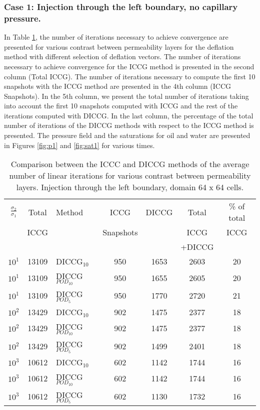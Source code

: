 \documentclass[12pt]{article}
\begin{document}
\subsubsection*{Case 1: Injection through the left boundary, no capillary pressure.}
In Table \ref{table:liter1}, the number of iterations necessary to achieve convergence are presented for various contrast between permeability layers for the deflation method with different selection of deflation vectors. The number of iterations necessary to achieve convergence for the ICCG method is presented in the second column (Total ICCG). The number of iterations necessary to compute the first 10 snapshots with the ICCG method are presented in the 4th column (ICCG Snapshots). In the 5th column, we present the total number of iterations taking into account the first 10 snapshots computed with ICCG and the rest of the iterations computed with DICCG. In the last column, the percentage of the total number of iterations of the DICCG methods with respect to the ICCG method is presented.   
The pressure field and the saturations for oil and water are presented in Figures \ref{fig:p1} and \ref{fig:sat1} for various times.
\begin{table}[!h]\centering
\begin{minipage}{1\textwidth}
 \centering
\begin{tabular}{ ||c|c||l|c|c|c|c||} 
\hline
$\frac{\sigma_2}{\sigma_1}$&Total&Method  & ICCG&DICCG &Total&\% of total\\ 
                           & ICCG     &  & Snapshots& &ICCG& ICCG\\ 
                            &     &  & & &+DICCG& \\
\hline 
$10^{1}$ &13109& DICCG$_{10}$&950&1653&2603&20\\ 
\hline  
$10^{1}$ &13109& DICCG$_{POD_{10}}$&950&1655&2605&20 \\ 
\hline  
$10^{1}$ &13109& DICCG$_{POD_{5}}$&950&1770&2720&21 \\ 
\hline  
$10^{2}$ &13429& DICCG$_{10}$&902&1475&2377&18\\ 
\hline  
$10^{2}$ &13429& DICCG$_{POD_{10}}$&902&1475&2377&18 \\ 
\hline  
$10^{2}$ &13429& DICCG$_{POD_{5}}$&902&1499&2401&18 \\ 
\hline 
$10^{3}$ &10612& DICCG$_{10}$&602&1142&1744&16\\ 
\hline  
$10^{3}$ &10612& DICCG$_{POD_{10}}$&602&1142&1744&16 \\ 
\hline  
$10^{3}$ &10612& DICCG$_{POD_{5}}$&602&1130&1732&16 \\ 
\hline  
\end{tabular} 
\caption{Comparison between the ICCC and DICCG methods of the average number of linear iterations for various contrast between permeability layers. Injection through the left boundary, domain 64 x 64 cells.}\label{table:liter1} 
\end{minipage}  
\end{table}  
\end{document}
